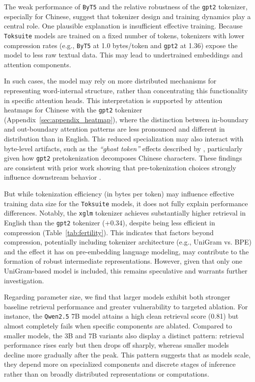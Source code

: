 \documentclass[11pt]{article}
\begin{document}
The weak performance of \texttt{ByT5} and the relative robustness of the \texttt{gpt2} tokenizer, especially for Chinese, suggest that tokenizer design and training dynamics play a central role. One plausible explanation is insufficient effective training. Because \texttt{Toksuite} models are trained on a fixed number of tokens, tokenizers with lower compression rates (e.g., \texttt{ByT5} at 1.0 bytes/token and \texttt{gpt2} at 1.36) expose the model to less raw textual data. This may lead to undertrained embeddings and attention components.

In such cases, the model may rely on more distributed mechanisms for representing word-internal structure, rather than concentrating this functionality in specific attention heads. This interpretation is supported by attention heatmaps for Chinese with the \texttt{gpt2} tokenizer (Appendix~\ref{sec:appendix_heatmap}), where the distinction between in-boundary and out-boundary attention patterns are less pronounced and different in distribution than in English. This reduced specialization may also interact with byte-level artifacts, such as the \textit{``ghost token''} effects described by \citet{jang2025}, particularly given how \texttt{gpt2} pretokenization decomposes Chinese characters. These findings are consistent with prior work showing that pre-tokenization choices strongly influence downstream behavior \citep{wegmann2025, arnett2025}.

But while tokenization efficiency (in bytes per token) may influence effective training data size for the \texttt{Toksuite} models, it does not fully explain performance differences. Notably, the \texttt{xglm} tokenizer achieves substantially higher retrieval in English than the \texttt{gpt2} tokenizer (+0.34), despite being less efficient in compression (Table~\ref{tab:fertility}). This indicates that factors beyond compression, potentially including tokenizer architecture (e.g., UniGram vs. BPE) and the effect it has on pre-embedding language modeling, may contribute to the formation of robust intermediate representations. However, given that only one UniGram-based model is included, this remains speculative and warrants further investigation.

Regarding parameter size, we find that larger models exhibit both stronger baseline retrieval performance and greater vulnerability to targeted ablation. For instance, the \texttt{Qwen2.5} 7B model attains a high clean retrieval score (0.81) but almost completely fails when specific components are ablated. Compared to smaller models, the 3B and 7B variants also display a distinct pattern: retrieval performance rises early but then drops off sharply, whereas smaller models decline more gradually after the peak. This pattern suggests that as models scale, they depend more on specialized components and discrete stages of inference rather than on broadly distributed representations or computations.
\end{document}
